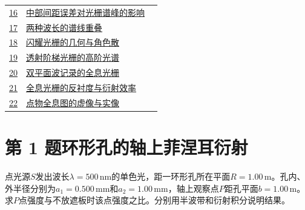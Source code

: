 \documentclass[UTF8,fontset=fandol,a4paper,11pt]{ctexart}
\begin{document}
\begin{longtable}{@{}r p{113mm} r@{}}
\hyperref[q:16]{16} & \hyperref[q:16]{中部间距误差对光栅谱峰的影响} & \pageref{q:16} \\

\hyperref[q:17]{17} & \hyperref[q:17]{两种波长的谱线重叠} & \pageref{q:17} \\

\hyperref[q:18]{18} & \hyperref[q:18]{闪耀光栅的几何与角色散} & \pageref{q:18} \\

\hyperref[q:19]{19} & \hyperref[q:19]{透射阶梯光栅的高阶光谱} & \pageref{q:19} \\

\hyperref[q:20]{20} & \hyperref[q:20]{双平面波记录的全息光栅} & \pageref{q:20} \\

\hyperref[q:21]{21} & \hyperref[q:21]{全息光栅的反衬度与衍射效率} & \pageref{q:21} \\

\hyperref[q:22]{22} & \hyperref[q:22]{点物全息图的虚像与实像} & \pageref{q:22} \\

\bottomrule\end{longtable}

\clearpage


\section*{第 1 题\quad 环形孔的轴上菲涅耳衍射}\label{q:1}

点光源$S$发出波长$\lambda=500\,\mathrm{nm}$的单色光，距一环形孔所在平面$R=1.00\,\mathrm m$。孔内、外半径分别为$a_1=0.500\,\mathrm{mm}$和$a_2=1.00\,\mathrm{mm}$，轴上观察点$P$距孔平面$b=1.00\,\mathrm m$。求$P$点强度与不放遮板时该点强度之比。分别用半波带和衍射积分说明结果。
\end{document}
